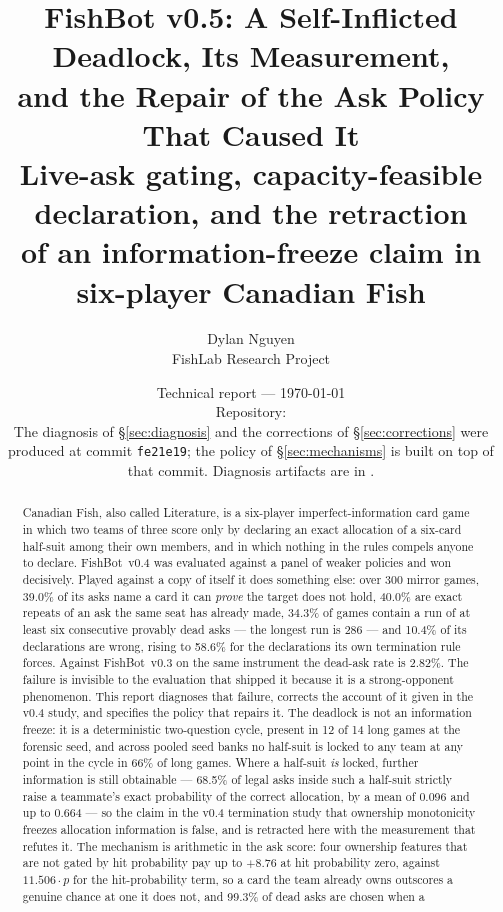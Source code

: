 \documentclass[11pt]{article}
\title{\textbf{FishBot v0.5: A Self-Inflicted Deadlock, Its Measurement,\\
and the Repair of the Ask Policy That Caused It}\\[5pt]
\large Live-ask gating, capacity-feasible declaration, and the retraction\\
of an information-freeze claim in six-player Canadian Fish}
\author{Dylan Nguyen\\\small FishLab Research Project}
\date{%
  \small Technical report --- \today\\[2pt]
  \small Repository: \filepath{https://github.com/dylann29/fish-optimization}\\[1pt]
  \small The diagnosis of \S\ref{sec:diagnosis} and the corrections of
  \S\ref{sec:corrections} were produced at commit \texttt{fe21e19}; the \vfive{}
  policy of \S\ref{sec:mechanisms} is built on top of that commit. Diagnosis
  artifacts are in \filepath{research/v05/results/}.%
}
\theoremstyle{definition}
\DeclareRobustCommand{\vfour}{\texorpdfstring{\mbox{FishBot v0.4}}{FishBot v0.4}}
\DeclareRobustCommand{\vthree}{\texorpdfstring{\mbox{FishBot v0.3}}{FishBot v0.3}}
\providecommand{\numMirrorGames}{300}
\providecommand{\numDeadAsk}{39.0}
\providecommand{\numRepeatAsk}{40.0}
\providecommand{\numDeadRunLongest}{286}
\providecommand{\numDeadRunGames}{34.3}
\providecommand{\numDeclWrong}{10.4}
\providecommand{\numPostHorizonWrong}{58.6}
\providecommand{\numVthreeDeadAsk}{2.82}
\providecommand{\numLongGames}{14}
\providecommand{\numPureCycle}{12}
\providecommand{\numNoLockPct}{66}
\providecommand{\numCertRate}{68.5}
\providecommand{\numCertMean}{0.096}
\providecommand{\numCertMax}{0.664}
\providecommand{\numHitWeight}{11.506}
\providecommand{\numOwnershipPay}{+8.76}
\providecommand{\numVoluntaryDead}{99.3}
\begin{document}
\maketitle
\thispagestyle{fancy}

\begin{abstract}
Canadian Fish, also called Literature, is a six-player imperfect-information card
game in which two teams of three score only by declaring an exact allocation of a
six-card half-suit among their own members, and in which nothing in the rules
compels anyone to declare. \vfour{} was evaluated against a panel of weaker
policies and won decisively. Played against a copy of itself it does something
else: over \numMirrorGames{} mirror games, \numDeadAsk\% of its asks name a card
it can \emph{prove} the target does not hold, \numRepeatAsk\% are exact repeats
of an ask the same seat has already made, \numDeadRunGames\% of games contain a
run of at least six consecutive provably dead asks --- the longest run is
\numDeadRunLongest{} --- and \numDeclWrong\% of its declarations are wrong,
rising to \numPostHorizonWrong\% for the declarations its own termination rule
forces. Against \vthree{} on the same instrument the dead-ask rate is
\numVthreeDeadAsk\%. The failure is invisible to the evaluation that shipped it
because it is a strong-opponent phenomenon.
This report diagnoses that failure, corrects the account of it given in the v0.4
study, and specifies the policy that repairs it. The deadlock is not an
information freeze: it is a deterministic two-question cycle, present in
\numPureCycle{} of \numLongGames{} long games at the forensic seed, and across
pooled seed banks no half-suit is locked to any team at any point in the cycle
in \numNoLockPct\% of long games. Where a
half-suit \emph{is} locked, further information is still obtainable ---
\numCertRate\% of legal asks inside such a half-suit strictly raise a teammate's
exact probability of the correct allocation, by a mean of \numCertMean{} and up
to \numCertMax{} --- so the claim in the v0.4 termination study that ownership
monotonicity freezes allocation information is false, and is retracted here with
the measurement that refutes it. The mechanism is arithmetic in the ask score:
four ownership features that are not gated by hit probability pay up to
$\numOwnershipPay$ at hit probability zero, against $\numHitWeight \cdot p$ for
the hit-probability term, so a card the team already owns outscores a genuine
chance at one it does not, and \numVoluntaryDead\% of dead asks are chosen when a

\end{abstract}
\end{document}
